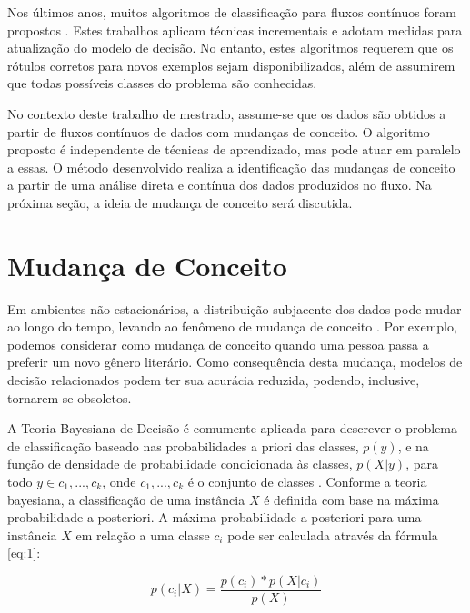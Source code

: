 \documentclass[qual, classic, a4paper]{ufbathesis}
\begin{document}
Nos últimos anos, muitos algoritmos de classificação para fluxos contínuos foram propostos 
\cite{Domingos:2000:MHD:347090.347107, Bifet:2013:EDS:2480362.2480516, Wang:2003:MCD:956750.956778, Aggarwal:2004:DCD:1014052.1014110, Gama:2003:ADT:956750.956813}.
Estes trabalhos aplicam técnicas incrementais e adotam medidas para atualização do modelo de decisão.
No entanto, estes algoritmos requerem que os rótulos corretos para novos exemplos sejam disponibilizados, 
além de assumirem que todas possíveis classes do problema são conhecidas.

No contexto deste trabalho de mestrado, assume-se que os dados são obtidos a partir de fluxos contínuos de dados com mudanças de conceito.
O algoritmo proposto é independente de técnicas de aprendizado, mas pode atuar em paralelo a essas.
O método desenvolvido realiza a identificação das mudanças de conceito a partir de uma análise direta e contínua dos dados produzidos no fluxo.
Na próxima seção, a ideia de mudança de conceito será discutida.

\section{Mudança de Conceito}

Em ambientes não estacionários, a distribuição subjacente dos dados pode mudar ao longo do tempo, levando ao fenômeno de mudança de conceito \cite{Schlimmer1986}.
Por exemplo, podemos considerar como mudança de conceito quando uma pessoa passa a preferir um novo gênero literário.
Como consequência desta mudança, modelos de decisão relacionados podem ter sua acurácia reduzida, podendo, inclusive, tornarem-se obsoletos.

A Teoria Bayesiana de Decisão \cite{Duda:2000:PC:954544} é comumente aplicada para descrever o problema de classificação baseado 
nas probabilidades a priori das classes, $p(y)$, e na função de densidade de probabilidade condicionada às classes, $p(X|y)$, para todo 
$y \in {c_1, ..., c_k}$, onde $c_1, ..., c_k$ é o conjunto de classes \cite{Zliobaite:2010, Gama:2014:SCD:2597757.2523813}.
Conforme a teoria bayesiana, a classificação de uma instância $X$ é definida com base na máxima probabilidade a posteriori.
A máxima probabilidade a posteriori para uma instância $X$ em relação a uma classe $c_i$ pode ser calculada através da fórmula \ref{eq:1}:

\begin{equation} \label{eq:1}
p(c_i|X) = \frac{p(c_i) * p(X|c_i)}{p(X)}
\end{equation}
\end{document}
